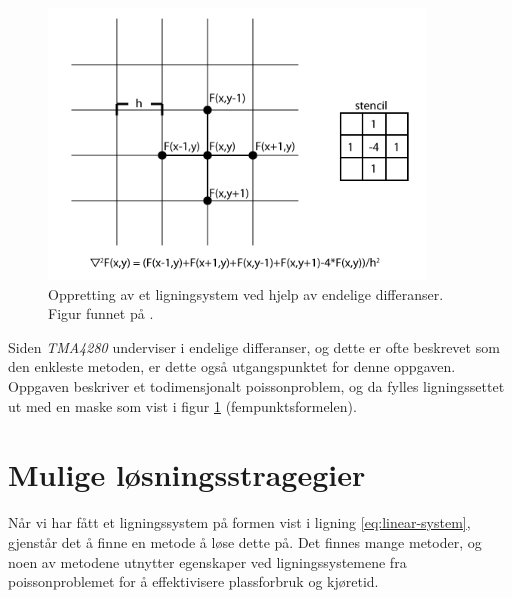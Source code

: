 \documentclass{article}
\begin{document}
\begin{figure}[t]
	\label{fig:finite-difference}
	\centering
	\includegraphics[width=10cm]{img/finite-difference.png}	
	\caption{Oppretting av et ligningsystem ved hjelp av endelige differanser. Figur funnet på \cite{rdw}. }
	
\end{figure}

Siden \emph{TMA4280} underviser i endelige differanser, og dette er ofte beskrevet som den enkleste metoden, er dette også utgangspunktet for denne oppgaven. Oppgaven beskriver et todimensjonalt poissonproblem, og da fylles ligningssettet ut med en maske som vist i figur \ref{fig:finite-difference} (fempunktsformelen).

\section{Mulige løsningsstragegier}
Når vi har fått et ligningssystem på formen vist i ligning \ref{eq:linear-system}, gjenstår det å finne en metode å løse dette på. Det finnes mange metoder, og noen av metodene utnytter egenskaper ved ligningssystemene fra poissonproblemet for å effektivisere plassforbruk og kjøretid.
\end{document}

